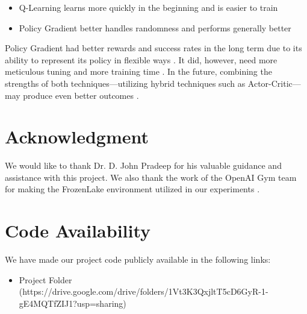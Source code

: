 \documentclass[conference]{IEEEtran}
\begin{document}
\begin{itemize}
\item Q-Learning learns more quickly in the beginning and is easier to train \cite{Watkins1992}
\item Policy Gradient better handles randomness and performs generally better \cite{Schulman2015}
\end{itemize}

Policy Gradient had better rewards and success rates in the long term due to its ability to represent its policy in flexible ways \cite{Kakade2002}. It did, however, need more meticulous tuning and more training time \cite{Schulman2015}. In the future, combining the strengths of both techniques—utilizing hybrid techniques such as Actor-Critic—may produce even better outcomes \cite{Degris2012}.

\section*{Acknowledgment}
We would like to thank Dr. D. John Pradeep for his valuable guidance and assistance with this project. We also thank the work of the OpenAI Gym team for making the FrozenLake environment utilized in our experiments \cite{Brockman2016}.

\section*{Code Availability}
We have made our project code publicly available in the following links:
\begin{itemize}
\item Project Folder (https://drive.google.com/drive/folders/1Vt3K3QxjltT5cD6GyR-1-gE4MQTfZIJ1?usp=sharing)
\end{itemize}
\end{document}
